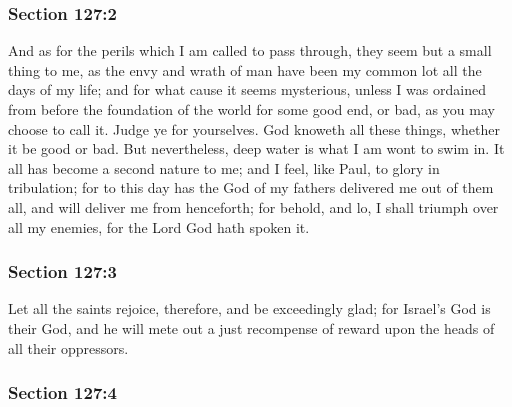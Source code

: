 	\subsubsection{Section 127:2} %
		\label{DC127-2}

		And as for the perils which I am called to pass through, they seem but a small thing to me, as the envy and wrath of man have been my common lot all the days of my life; and for what cause it seems mysterious, unless I was ordained from before the foundation of the world for some good end, or bad, as you may choose to call it.  Judge ye for yourselves.  God knoweth all these things, whether it be good or bad.  But nevertheless, deep water is what I am wont to swim in.  It all has become a second nature to me; and I feel, like Paul, to glory in tribulation; for to this day has the God of my fathers delivered me out of them all, and will deliver me from henceforth; for behold, and lo, I shall triumph over all my enemies, for the Lord God hath spoken it.


	\subsubsection{Section 127:3} %
		\label{DC127-3}

		Let all the saints rejoice, therefore, and be exceedingly glad; for Israel's God is their God, and he will mete out a just recompense of reward upon the heads of all their oppressors.


	\subsubsection{Section 127:4} %
		\label{DC127-4}

